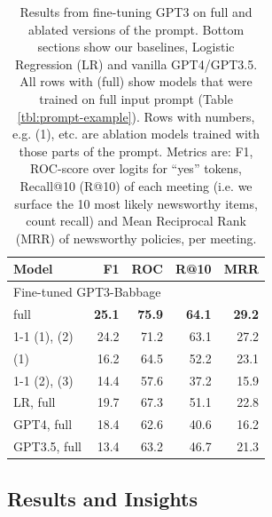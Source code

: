 \documentclass[11pt]{article}
\begin{document}
\begin{table}[t]
    \centering
    \begin{tabular}{lrrrr}
        \toprule
         Model & F1 & ROC & R@10 & MRR \\
         \midrule
         \multicolumn{4}{l}{Fine-tuned GPT3-Babbage} & {}  \\ 
         \midrule
         \quad full & \textbf{25.1} & \textbf{75.9} & \textbf{64.1} & \textbf{29.2} \\
         \cmidrule(lr){1-1}
         \quad (1), (2) & 24.2 & 71.2 & 63.1 & 27.2 \\
         \quad (1)  & 16.2 & 64.5 & 52.2 & 23.1 \\
         \cmidrule(lr){1-1}
         \quad (2), (3) & 14.4 & 57.6 & 37.2 & 15.9 \\
         \toprule
         LR, full & 19.7 & 67.3 & 51.1 & 22.8 \\
         \midrule
         GPT4, full & 18.4 & 62.6 & 40.6 & 16.2 \\
         GPT3.5, full & 13.4 & 63.2 & 46.7 & 21.3 \\
         \bottomrule
    \end{tabular}
    \caption{Results from fine-tuning GPT3 on full and ablated versions of the prompt. Bottom sections show our baselines, Logistic Regression (LR) and vanilla GPT4/GPT3.5. All rows with (full) show models that were trained on full input prompt (Table \ref{tbl:prompt-example}). Rows with numbers, e.g. (1), etc. are ablation models trained with those parts of the prompt. Metrics are: F1, ROC-score over logits for ``yes'' tokens, Recall@10 (R@10) of each meeting (i.e. we surface the 10 most likely newsworthy items, count recall) and Mean Reciprocal Rank (MRR) of newsworthy policies, per meeting. }
    \label{tab:gpt3-results}
\end{table}

\subsection{Results and Insights}
\label{sct:sct-2:results}
\end{document}
